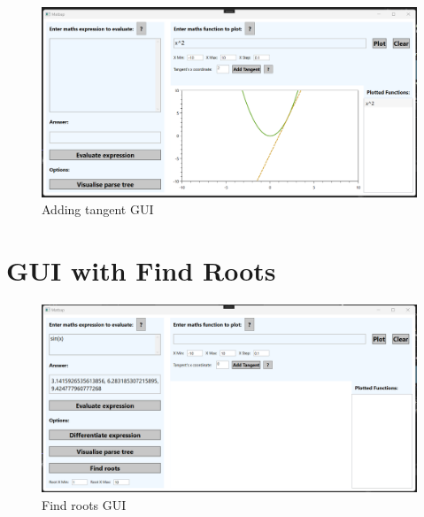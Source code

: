 \documentclass[a4paper, oneside, 11pt]{report}
\begin{document}
\begin{figure}[H]
\begin{center}
\includegraphics[scale=0.5]{AddTangentsGUI.png}
\caption{Adding tangent GUI}
\label{basicgui}
\end{center}
\end{figure}

\section{GUI with Find Roots}
\begin{figure}[H]
\begin{center}
\includegraphics[scale=0.5]{FindRootsGUI.png}
\caption{Find roots GUI}
\label{basicgui}
\end{center}
\end{figure}
\end{document}
